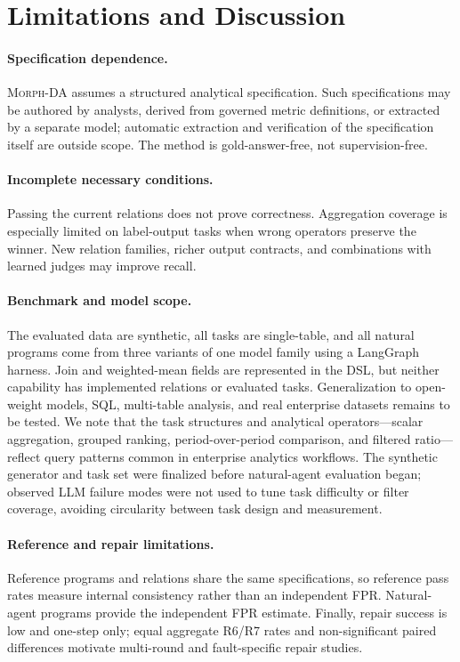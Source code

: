 \documentclass{article}
\newcommand{\morph}{\textsc{Morph-DA}\xspace}
\begin{document}
\section{Limitations and Discussion}
\label{sec:limitations}

\paragraph{Specification dependence.}
\morph assumes a structured analytical specification. Such specifications may be authored by analysts, derived from governed metric definitions, or extracted by a separate model; automatic extraction and verification of the specification itself are outside scope. The method is gold-answer-free, not supervision-free.

\paragraph{Incomplete necessary conditions.}
Passing the current relations does not prove correctness. Aggregation coverage is especially limited on label-output tasks when wrong operators preserve the winner. New relation families, richer output contracts, and combinations with learned judges may improve recall.

\paragraph{Benchmark and model scope.}
The evaluated data are synthetic, all tasks are single-table, and all natural programs come from three variants of one model family using a LangGraph harness. Join and weighted-mean fields are represented in the DSL, but neither capability has implemented relations or evaluated tasks. Generalization to open-weight models, SQL, multi-table analysis, and real enterprise datasets remains to be tested. We note that the task structures and analytical operators---scalar aggregation, grouped ranking, period-over-period comparison, and filtered ratio---reflect query patterns common in enterprise analytics workflows. The synthetic generator and task set were finalized before natural-agent evaluation began; observed LLM failure modes were not used to tune task difficulty or filter coverage, avoiding circularity between task design and measurement.

\paragraph{Reference and repair limitations.}
Reference programs and relations share the same specifications, so reference pass rates measure internal consistency rather than an independent FPR. Natural-agent programs provide the independent FPR estimate. Finally, repair success is low and one-step only; equal aggregate R6/R7 rates and non-significant paired differences motivate multi-round and fault-specific repair studies.
\end{document}
